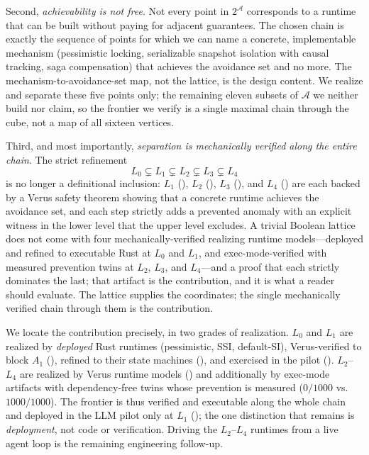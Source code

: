 \documentclass[journal,compsoc,10pt]{IEEEtran}
\theoremstyle{definition}
\theoremstyle{remark}
\begin{document}
Second, \emph{achievability is not free}. Not every point in
$2^{\mathcal{A}}$ corresponds to a runtime that can be built
without paying for adjacent guarantees. The chosen chain is
exactly the sequence of points for which we can name a
concrete, implementable mechanism (pessimistic locking,
serializable snapshot isolation with causal tracking, saga
compensation) that achieves the avoidance set and no more. The
mechanism-to-avoidance-set map, not the lattice, is the design
content. We realize and separate these five points only; the remaining
eleven subsets of $\mathcal{A}$ we neither build nor claim, so the frontier
we verify is a single maximal chain through the cube, not a map of all
sixteen vertices.

Third, and most importantly,
\emph{separation is mechanically verified along the entire
chain}. The strict refinement
\[
L_0 \subsetneq L_1 \subsetneq L_2 \subsetneq L_3 \subsetneq L_4
\]
is no longer a definitional inclusion: $L_1$
(), $L_2$ (),
$L_3$ (), and $L_4$ ()
are each backed by a Verus safety theorem showing that a
concrete runtime achieves the avoidance set, and each step
strictly adds a prevented anomaly with an explicit witness in
the lower level that the upper level excludes. A trivial
Boolean lattice does not come with four mechanically-verified
realizing runtime models---deployed and refined to executable Rust at
$L_0$ and $L_1$, and exec-mode-verified with measured prevention twins at
$L_2$, $L_3$, and $L_4$---and a proof that each
strictly dominates the last; that artifact is the contribution, and it is what a
reader should evaluate. The lattice supplies the coordinates;
the single mechanically verified chain through them is the contribution.

We locate the contribution precisely, in two grades of
realization. $L_0$ and $L_1$ are realized by \emph{deployed} Rust runtimes
(pessimistic, SSI, default-SI), Verus-verified to block $A_1$
(), refined to their state machines
(), and exercised in the pilot
(). $L_2$--$L_4$ are realized by Verus runtime models
() and additionally by
exec-mode artifacts with dependency-free twins whose prevention is
measured ($0/1000$ vs.\ $1000/1000$). The frontier is thus verified and
executable along the whole chain and deployed in the LLM pilot only at
$L_1$ (); the one distinction that remains is
\emph{deployment}, not code or verification. Driving the $L_2$--$L_4$
runtimes from a live agent loop is the remaining engineering follow-up.
\end{document}
